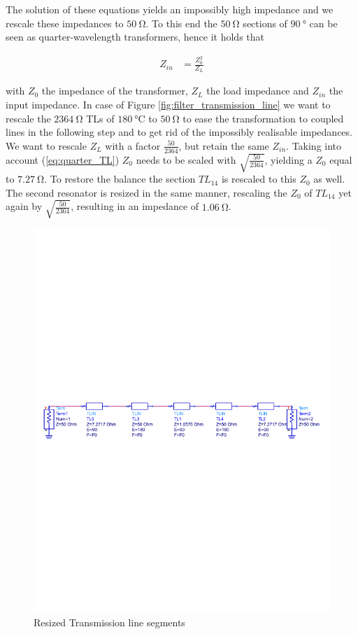 \documentclass[a4paper]{article}        %
\begin{document}
  The solution of these equations yields an impossibly high impedance and we rescale these impedances to $\SI{50}{\ohm}$. To this end the $\SI{50}{\ohm}$ sections of $\SI{90}{\degree}$ can be seen as quarter-wavelength transformers, hence it holds that

  \begin{align}
  	Z_{in} &= \frac{Z_0^2}{Z_L}
  \label{eq:quarter_TL}
  \end{align}

  with $Z_0$ the impedance of the transformer, $Z_L$ the load impedance and $Z_{in}$ the input impedance. In case of Figure \ref{fig:filter_transmission_line} we want to rescale the $\SI{2364}{\ohm}$ TLs of $\SI{180}{\celsius}$ to $\SI{50}{\ohm}$ to ease the transformation to coupled lines in the following step and to get rid of the impossibly realisable impedances. We want to rescale $Z_L$ with a factor $\frac{50}{2364}$, but retain the same $Z_{in}$. Taking into account (\ref{eq:quarter_TL}) $Z_0$ needs to be scaled with $\sqrt{\frac{50}{2364}}$, yielding a $Z_0$ equal to $\SI{7.27}{\ohm}$.
  To restore the balance the section $TL_{14}$ is rescaled to this $Z_0$ as well.
  The second resonator is resized in the same manner, rescaling the $Z_0$ of $TL_{14}$ yet again by $\sqrt{\frac{50}{2364}}$, resulting in an impedance of $\SI{1.06}{\ohm}$.

  \begin{figure}[H]
    \centering
    \includegraphics[width=\textwidth]{fig/Filter/2nd_order/bandpass_TL_rescaled_imp.pdf}
    \caption{Resized Transmission line segments}
    \label{fig:filter_transmission_resized}
  \end{figure}
\end{document}
